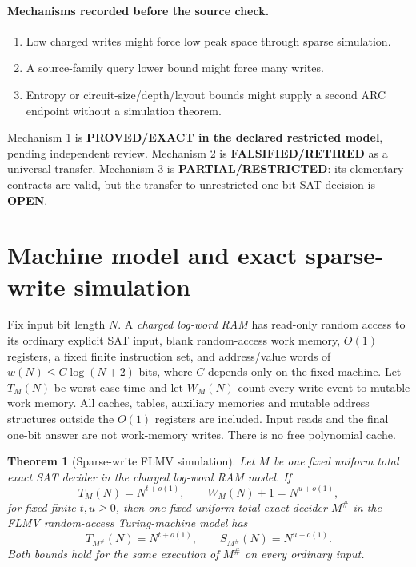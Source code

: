 \documentclass[11pt]{article}
\newtheorem{theorem}{Theorem}
\newcommand{\OPEN}{\textbf{OPEN}}
\begin{document}
\paragraph{Mechanisms recorded before the source check.}
\begin{enumerate}
\item Low charged writes might force low peak space through sparse simulation.
\item A source-family query lower bound might force many writes.
\item Entropy or circuit-size/depth/layout bounds might supply a second ARC
endpoint without a simulation theorem.
\end{enumerate}
Mechanism 1 is \textbf{PROVED/EXACT in the declared restricted model}, pending
independent review.  Mechanism 2 is \textbf{FALSIFIED/RETIRED} as a universal
transfer.  Mechanism 3 is \textbf{PARTIAL/RESTRICTED}: its elementary
contracts are valid, but the transfer to unrestricted one-bit SAT decision is
\OPEN.

\section{Machine model and exact sparse-write simulation}
Fix input bit length $N$.  A \emph{charged log-word RAM} has read-only random
access to its ordinary explicit SAT input, blank random-access work memory,
$O(1)$ registers, a fixed finite instruction set, and address/value words of
$w(N)\le C\log(N+2)$ bits, where $C$ depends only on the fixed machine.
Let $T_M(N)$ be worst-case time and let $W_M(N)$ count every write event to
mutable work memory.  All caches, tables, auxiliary memories and mutable
address structures outside the $O(1)$ registers are included.  Input reads
and the final one-bit answer are not work-memory writes.  There is no free
polynomial cache.

\begin{theorem}[Sparse-write FLMV simulation]
\label{thm:sparse}
Let $M$ be one fixed uniform total exact SAT decider in the charged log-word
RAM model.  If
\[
 T_M(N)=N^{t+o(1)},\qquad W_M(N)+1=N^{u+o(1)},
\]
for fixed finite $t,u\ge0$, then one fixed uniform total exact decider
$M^{\#}$ in the FLMV random-access Turing-machine model has
\[
 T_{M^{\#}}(N)=N^{t+o(1)},\qquad
 S_{M^{\#}}(N)=N^{u+o(1)}.
\]
Both bounds hold for the same execution of $M^{\#}$ on every ordinary input.
\end{theorem}
\end{document}
